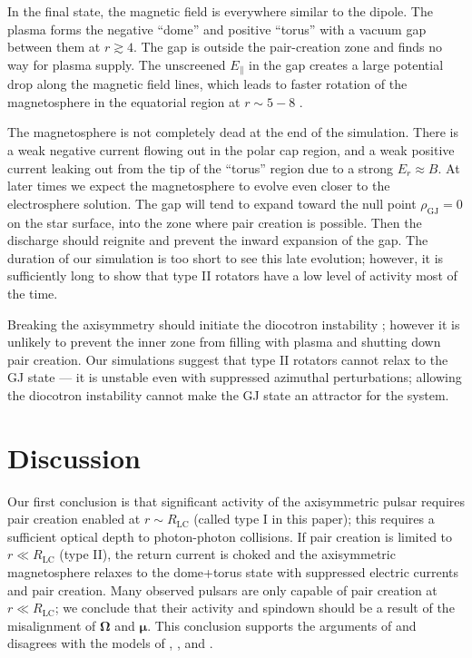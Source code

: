 In the final state, the magnetic field is everywhere similar to the dipole.
The plasma forms the negative ``dome'' and positive ``torus''
with a vacuum gap between them at $r\gtrsim 4$.
The gap is outside the pair-creation zone and finds no way for plasma supply.
The unscreened $E_\parallel$ in the gap creates a
large potential drop along the
magnetic field lines, which leads to faster rotation of the magnetosphere in the
equatorial region at $r\sim 5-8$
\citep[cf.][]{wada_particle_2011}.

The magnetosphere is not completely dead at the end of the simulation.
There is a weak negative current flowing out in the polar cap region, and
a weak positive current leaking out from the tip of the ``torus'' region
due to a strong $E_r\approx B$.
At later times we expect the magnetosphere to evolve even closer to
the electrosphere solution.  The gap will tend to expand toward the
null point $\rho_\mathrm{GJ}=0$
on the star surface, into the zone where pair creation is
possible. Then the discharge should reignite and prevent the inward
expansion of the gap. The duration of our simulation is too short to
see this late evolution; however, it is sufficiently long to show that type
II rotators have a low level of activity most of the time.

Breaking the axisymmetry should initiate the diocotron instability
\citep{philippov_ab_2014};  however it is unlikely to
prevent the inner zone from filling with plasma and
shutting down pair creation. Our simulations suggest that type II rotators
cannot relax to the GJ state
--- it is unstable even with suppressed azimuthal perturbations; allowing the
diocotron instability cannot make the GJ state an attractor for the system.



\section{Discussion}


Our first conclusion is that significant activity of the axisymmetric pulsar
requires pair creation enabled at $r\sim R_\mathrm{LC}$
(called type I in this paper); this requires a sufficient optical
depth to photon-photon collisions.
If pair creation is limited to $r\ll R_\mathrm{LC}$ (type II),
the return current is choked and the axisymmetric magnetosphere relaxes to the
dome+torus state with suppressed electric currents and pair creation.
Many observed pulsars are only capable of pair creation at
$r\ll R_\mathrm{LC}$; we conclude that their activity and spindown should
be a result of the misalignment of $\symbf{\Omega}$ and $\symbf{\mu}$. This conclusion
supports the arguments of
\citet{michel_state_2004}
 and disagrees with the models of
\citet{goldreich_pulsar_1969},
\citet{ruderman_theory_1975},
and
\citet{gruzinov_aristotelian_2013}.

